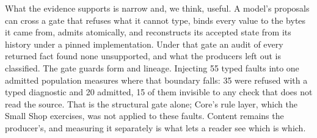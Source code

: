 What the evidence supports is narrow and, we think, useful. A model's proposals can cross a gate that refuses what it cannot type, binds every value to the bytes it came from, admits atomically, and reconstructs its accepted state from its history under a pinned implementation. Under that gate an audit of every returned fact found none unsupported, and what the producers left out is classified. The gate guards form and lineage. Injecting 55 typed faults into one admitted population measures where that boundary falls: 35 were refused with a typed diagnostic and 20 admitted, 15 of them invisible to any check that does not read the source. That is the structural gate alone; Core's rule layer, which the Small Shop exercises, was not applied to these faults. Content remains the producer's, and measuring it separately is what lets a reader see which is which.

